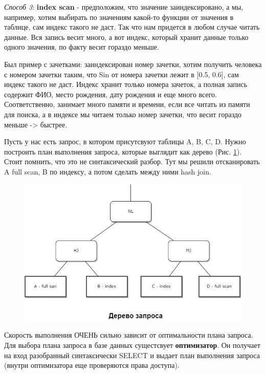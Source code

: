 \begin{enumerate}
\textit{Способ 3}: \textbf{index scan} - предположим, что значение заиндексировано, а мы, например, хотим выбирать по значениям какой-то функции от значения в таблице, сам индекс такого не даст. Так что нам придется в любом случае читать данные. Вся запись весит много, а вот индекс, который хранит данные только одного значения, по факту весит гораздо меньше. 

Был пример с зачетками: заиндексирован номер зачетки, хотим получить человека с номером зачетки таким, что Sin от номера зачетки лежит в [0.5, 0.6], сам индекс такого не даст. Индекс хранит только номера зачеток, а полная запись содержит ФИО, место рождения, дату рождения и еще много всего. Соответственно, занимает много памяти и времени, если все читать из памяти для поиска, а в индексе мы читаем только номер зачетки, что весит гораздо меньше -> быстрее. 


\end{enumerate}


Пусть у нас есть запрос, в котором присутсвуют таблицы A, B, C, D. Нужно построить план выполнения запроса, которые выглядит как дерево (Рис. \ref{fig:plan1}). Стоит помнить, что это не синтаксический разбор. Тут мы решили отсканировать A full scan, B по индексу, а потом сделать между ними hash join. 

\begin{figure}[h!]
    \centering
    \includegraphics[scale = 0.5]{5/plan.jpg}
    \caption{}
    \label{fig:plan1}
\end{figure}

Скорость выполнения ОЧЕНЬ сильно зависит от оптимальности плана запроса.
\\[20pt]
Для выбора плана запроса в базе данных сущестсвует \textbf{оптимизатор}. Он получает на вход разобранный синтаксически SELECT и выдает план выполнения запроса (внутри оптимизатора еще проверяются права доступа). 

